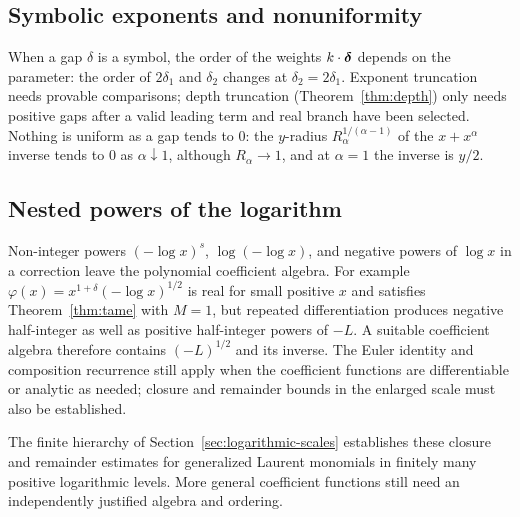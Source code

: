 \subsection{Symbolic exponents and nonuniformity}

When a gap $\delta$ is a symbol, the order of the weights $k\cdot\boldsymbol\delta$ depends on the parameter: the order of $2\delta_1$ and $\delta_2$ changes at $\delta_2=2\delta_1$. Exponent truncation needs provable comparisons; depth truncation (Theorem~\ref{thm:depth}) only needs positive gaps after a valid leading term and real branch have been selected. Nothing is uniform as a gap tends to $0$: the $y$-radius $R_\alpha^{1/(\alpha-1)}$ of the $x+x^\alpha$ inverse tends to $0$ as $\alpha\downarrow1$, although $R_\alpha\to1$, and at $\alpha=1$ the inverse is $y/2$.

\subsection{Nested powers of the logarithm}

Non-integer powers $(-\log x)^s$, $\log(-\log x)$, and negative powers of $\log x$ in a correction leave the polynomial coefficient algebra. For example $\varphi(x)=x^{1+\delta}(-\log x)^{1/2}$ is real for small positive $x$ and satisfies Theorem~\ref{thm:tame} with $M=1$, but repeated differentiation produces negative half-integer as well as positive half-integer powers of $-L$. A suitable coefficient algebra therefore contains $(-L)^{1/2}$ and its inverse. The Euler identity and composition recurrence still apply when the coefficient functions are differentiable or analytic as needed; closure and remainder bounds in the enlarged scale must also be established.

The finite hierarchy of Section~\ref{sec:logarithmic-scales} establishes these closure and remainder estimates for generalized Laurent monomials in finitely many positive logarithmic levels. More general coefficient functions still need an independently justified algebra and ordering.
